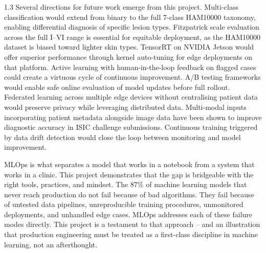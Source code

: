 \begin{spacing}{1.3}
Several directions for future work emerge from this project. Multi-class classification would extend from binary to the full 7-class HAM10000 taxonomy, enabling differential diagnosis of specific lesion types. Fitzpatrick scale evaluation across the full I--VI range is essential for equitable deployment, as the HAM10000 dataset is biased toward lighter skin types. TensorRT on NVIDIA Jetson would offer superior performance through kernel auto-tuning for edge deployments on that platform. Active learning with human-in-the-loop feedback on flagged cases could create a virtuous cycle of continuous improvement. A/B testing frameworks would enable safe online evaluation of model updates before full rollout. Federated learning across multiple edge devices without centralising patient data would preserve privacy while leveraging distributed data. Multi-modal inputs incorporating patient metadata alongside image data have been shown to improve diagnostic accuracy in ISIC challenge submissions. Continuous training triggered by data drift detection would close the loop between monitoring and model improvement.

MLOps is what separates a model that works in a notebook from a system that works in a clinic. This project demonstrates that the gap is bridgeable with the right tools, practices, and mindset. The 87\% of machine learning models that never reach production do not fail because of bad algorithms. They fail because of untested data pipelines, unreproducible training procedures, unmonitored deployments, and unhandled edge cases. MLOps addresses each of these failure modes directly. This project is a testament to that approach -- and an illustration that production engineering must be treated as a first-class discipline in machine learning, not an afterthought.

\end{spacing}
